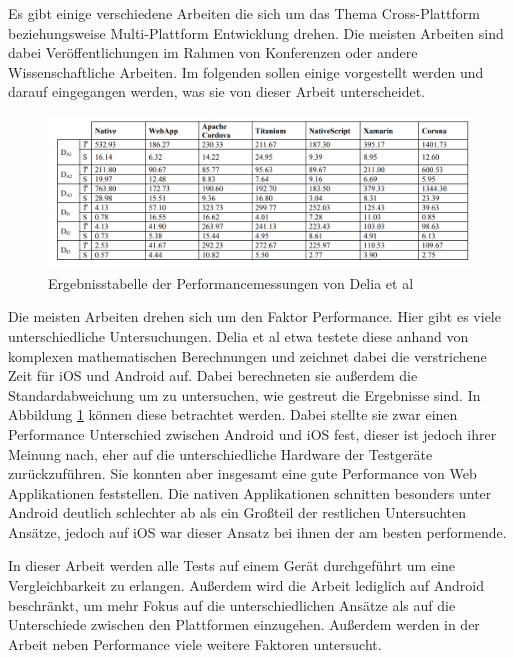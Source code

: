 Es gibt einige verschiedene Arbeiten die sich um das Thema Cross-Plattform beziehungsweise Multi-Plattform Entwicklung drehen. Die meisten Arbeiten sind dabei Veröffentlichungen im Rahmen von Konferenzen oder andere Wissenschaftliche Arbeiten. Im folgenden sollen einige vorgestellt werden und darauf eingegangen werden, was sie von dieser Arbeit unterscheidet.


\begin{figure}[ht]
  \centering
  \includegraphics[width=\textwidth,keepaspectratio]{images/IEEE_Delia_Al.png}
  \caption{Ergebnisstabelle der Performancemessungen von Delia et al \cite{IEEE_development_classes}}
  \label{fig:result_table_IEEE_related_work}
\end{figure}

Die meisten Arbeiten drehen sich um den Faktor Performance. Hier gibt es viele unterschiedliche Untersuchungen. Delia et al \cite{IEEE_development_classes} etwa testete diese anhand von komplexen mathematischen Berechnungen und zeichnet dabei die verstrichene Zeit für iOS und Android auf. Dabei berechneten sie außerdem die Standardabweichung um zu untersuchen, wie gestreut die Ergebnisse sind. In Abbildung \ref{fig:result_table_IEEE_related_work} können diese betrachtet werden. Dabei stellte sie zwar einen Performance Unterschied zwischen Android und iOS fest, dieser ist jedoch ihrer Meinung nach, eher auf die unterschiedliche Hardware der Testgeräte zurückzuführen. Sie konnten aber insgesamt eine gute Performance von Web Applikationen feststellen. Die nativen Applikationen schnitten besonders unter Android deutlich schlechter ab als ein Großteil der restlichen Untersuchten Ansätze, jedoch auf iOS war dieser Ansatz bei ihnen der am besten performende.

In dieser Arbeit werden alle Tests auf einem Gerät durchgeführt um eine Vergleichbarkeit zu erlangen. Außerdem wird die Arbeit lediglich auf Android beschränkt, um mehr Fokus auf die unterschiedlichen Ansätze als auf die Unterschiede zwischen den Plattformen einzugehen. Außerdem werden in der Arbeit neben Performance viele weitere Faktoren untersucht. 
 
